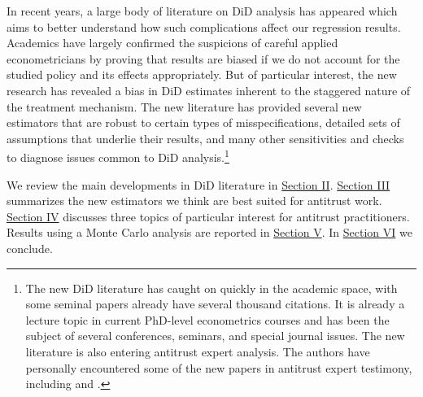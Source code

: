 \documentclass[12pt]{article}
\begin{document}
In recent years, a large body of literature on DiD analysis has appeared which aims to better understand how such complications affect our regression results. Academics have largely confirmed the suspicions of careful applied econometricians by proving that results are biased if we do not account for the studied policy and its effects appropriately. But of particular interest, the new research has revealed a bias in DiD estimates inherent to the staggered nature of the treatment mechanism. The new literature has provided several new estimators that are robust to certain types of misspecifications, detailed sets of assumptions that underlie their results, and many other sensitivities and checks to diagnose issues common to DiD analysis.\footnote{The new DiD literature has caught on quickly in the academic space, with some seminal papers already have several thousand citations. It is already a lecture topic in current PhD-level econometrics courses and has been the subject of several conferences, seminars, and special journal issues. The new literature is also entering antitrust expert analysis. The authors have personally encountered some of the new papers in antitrust expert testimony, including \citet{CS2021} and \citet{goodman-bacon2021a}.}

We review the main developments in DiD literature in \hyperref[sec:literature]{Section II}. \hyperref[sec:analysis]{Section III} summarizes the new estimators we think are best suited for antitrust work. \hyperref[sec:antitrust]{Section IV} discusses three topics of particular interest for antitrust practitioners. Results using a Monte Carlo analysis are reported in \hyperref[sec:analysis]{Section V}. In \hyperref[sec:conclusion]{Section VI} we conclude.
\end{document}
